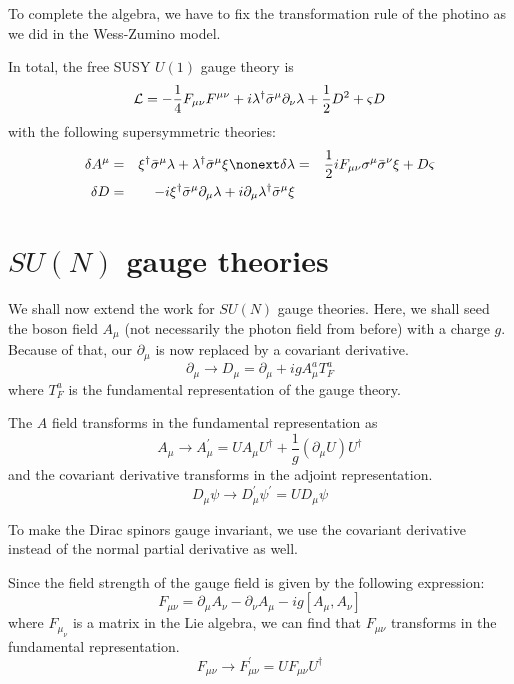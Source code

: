 To complete the algebra, we have to fix the transformation rule of the photino as we did in the Wess-Zumino model.

In total, the free SUSY $U(1)$ gauge theory is
\begin{equation}
    \mathcal{L} = -\frac{1}{4}F_{\mu\nu}F^{\mu\nu} + i \lambda^\dagger \Bar{\sigma}^\mu \partial_\nu \lambda + \frac{1}{2} D^2 + \varsigma D
    \label{eqn:10:u1 gauge theory:free lagrangian}
\end{equation}
with the following supersymmetric theories:
\begin{eqnarray}
    \delta A^\mu &=& \xi^\dagger \Bar{\sigma}^\mu \lambda + \lambda^\dagger \Bar{\sigma}^\mu \xi \nonext 
    \delta \lambda &=& \frac{1}{2} i F_{\mu \nu} \sigma^\mu \Bar{\sigma}^\nu \xi + D \varsigma \label{eqn:10:u1 gauge theory:transformation rules}\\
    \delta D &=& -i \xi^\dagger \Bar{\sigma}^\mu \partial_\mu \lambda + i \partial_\mu \lambda^\dagger \Bar{\sigma}^\mu \xi \nonumber
\end{eqnarray}

\section{$SU(N)$ gauge theories}
We shall now extend the work for $SU(N)$ gauge theories. Here, we shall seed the boson field $A_\mu$ (not necessarily the photon field from before) with a charge $g$. Because of that, our $\partial_\mu$ is now replaced by a covariant derivative.
\begin{equation}
    \partial_\mu \rightarrow D_\mu = \partial_\mu + ig A_\mu^a T_F^a
\end{equation}
where $T_F^a$ is the fundamental representation of the gauge theory.

The $A$ field transforms in the fundamental representation as
\begin{equation}
    A_\mu \rightarrow A^\prime_\mu = UA_\mu U^\dagger + \frac{1}{g}(\partial_\mu U)U^\dagger
\end{equation}
and the covariant derivative transforms in the adjoint representation.
\begin{equation}
    D_\mu \psi \rightarrow D^\prime_\mu \psi^\prime = U D_\mu \psi
\end{equation}

To make the Dirac spinors gauge invariant, we use the covariant derivative instead of the normal partial derivative as well.

Since the field strength of the gauge field is given by the following expression:
\begin{equation}
    F_{\mu\nu} = \partial_\mu A_\nu - \partial_\nu A_\mu - ig [A_\mu, A_\nu]
\end{equation}
where $F_{\mu_\nu}$ is a matrix in the Lie algebra, we can find that $F_{\mu\nu}$ transforms in the fundamental representation.
\begin{equation}
    F_{\mu\nu} \rightarrow F_{\mu\nu}^\prime = U F_{\mu\nu} U^\dagger
\end{equation}

